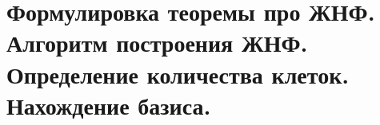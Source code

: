 \section{
    Формулировка теоремы про ЖНФ. Алгоритм построения ЖНФ. Определение количества клеток. Нахождение базиса. 
}


